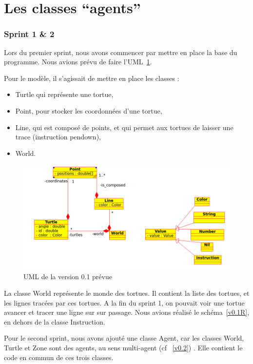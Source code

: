 \section{Les classes \enquote{agents}}
\subsubsection{Sprint 1 \& 2}
Lors du premier sprint, nous avons commencer par mettre en place la base du programme. Nous avions prévu de faire l'UML~\ref{v0.1}.

 Pour le modèle, il s'agissait de mettre en place les classes :
\begin{itemize}
\item Turtle qui représente une tortue, 
\item Point, pour stocker les coordonnées d'une tortue,
\item Line, qui est composé de points, et qui permet aux tortues de laisser une trace (instruction pendown),
\item World.
\end{itemize}


\begin{figure}[h]
\caption{\label{v0.1} UML de la version 0.1 prévue}
\includegraphics[scale=0.5]{doc/report/uml/v01.png}
\end{figure}


La classe World représente le monde des tortues. Il contient la liste des tortues, et les lignes tracées par ces tortues.
A la fin du sprint 1, on pouvait voir une tortue avancer et tracer une ligne sur sur passage.
Nous avions réalisé le schéma~\ref{v0.1R}, en dehors de la classe Instruction.


Pour le second sprint, nous avons ajouté une classe Agent, car les classes World, Turtle et Zone sont des agents, au sens multi-agent (cf ~\ref{v0.2}) . Elle contient le code en commun de ces trois classes.
 
